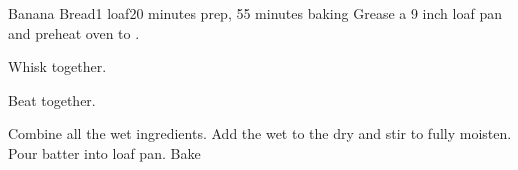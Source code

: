 \documentclass[../Cookbook.tex]{subfiles}
\begin{document}
\begin{recipe}{Banana Bread}{1 loaf}{20 minutes prep, 55 minutes baking}
	Grease a 9 inch loaf pan and preheat oven to .

	Whisk together.

	Beat together.

	Combine all the wet ingredients.
	Add the wet to the dry and stir to fully moisten.
	Pour batter into loaf pan.
	Bake 
\end{recipe}
\end{document}
